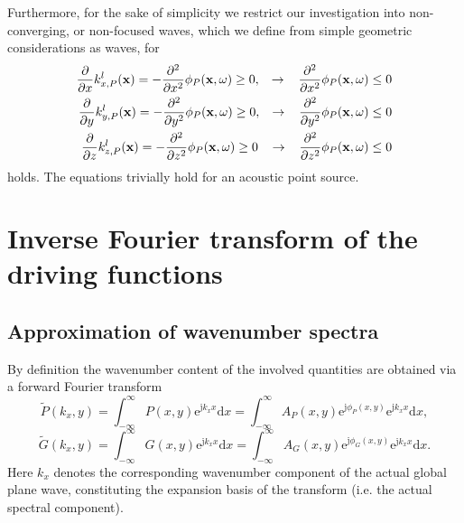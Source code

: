 \documentclass[12pt,a4paper]{article}
\newcommand{\td}{\mathrm{d}}
\newcommand{\te}{\mathrm{e}}
\newcommand{\ti}{\mathrm{j}}
\newcommand{\vx}{\mathbf{x}}
\begin{document}
Furthermore, for the sake of simplicity we restrict our investigation into non-converging, or non-focused waves, which we define from simple geometric considerations as waves, for 
\begin{eqnarray}
\frac{\partial}{\partial x} k_{x,P}^l(\vx) = -\frac{\partial^2}{\partial x^2} \phi_P (\vx,\omega) \geq 0, \hspace{3mm}\rightarrow \hspace{3mm} \frac{\partial^2}{\partial x^2} \phi_P (\vx,\omega) \leq 0\\
\frac{\partial}{\partial y} k_{y,P}^l(\vx) = -\frac{\partial^2}{\partial y^2} \phi_P (\vx,\omega) \geq 0, \hspace{3mm}\rightarrow \hspace{3mm} \frac{\partial^2}{\partial y^2} \phi_P (\vx,\omega) \leq 0\\
\frac{\partial}{\partial z} k_{z,P}^l(\vx) = -\frac{\partial^2}{\partial z^2} \phi_P (\vx,\omega) \geq 0 \hspace{3mm}\rightarrow \hspace{3mm} \frac{\partial^2}{\partial z^2} \phi_P (\vx,\omega) \leq 0
\end{eqnarray}
holds. The equations trivially hold for an acoustic point source.

\section{Inverse Fourier transform of the driving functions}

\subsection{Approximation of wavenumber spectra}
By definition the wavenumber content of the involved quantities are obtained via a forward Fourier transform
\begin{equation}
\tilde{P}(k_x,y) = \int_{-\infty}^{\infty} P(x,y) \te^{\ti k_x x} \td x = \int_{-\infty}^{\infty} A_P(x,y) \te^{\ti \phi_P(x,y)} \te^{\ti k_x x} \td x,
\end{equation}
\begin{equation}
\tilde{G}(k_x,y) = \int_{-\infty}^{\infty} G(x,y) \te^{\ti k_x x} \td x = \int_{-\infty}^{\infty} A_G(x,y) \te^{\ti \phi_G(x,y)} \te^{\ti k_x x} \td x.
\end{equation}
Here $k_x$ denotes the corresponding wavenumber component of the actual global plane wave, constituting the expansion basis of the transform (i.e. the actual spectral component).
\end{document}
